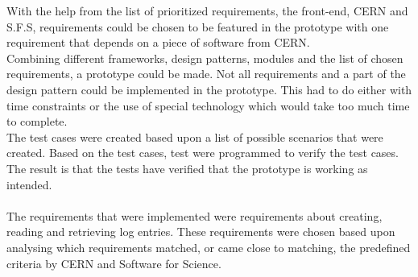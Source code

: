 \documentclass[paper=a4, fontsize=11pt,twoside]{scrartcl}	%
\begin{document}
With the help from the list of prioritized requirements, the front-end, CERN and S.F.S, requirements could be chosen to be featured in the prototype with one requirement that depends on a piece of software from CERN. \\
Combining different frameworks, design patterns, modules and the list of chosen requirements, a prototype could be made. Not all requirements and a part of the design pattern could be implemented in the prototype. This had to do either with time constraints or the use of special technology which would take too much time to complete. \\
The test cases were created based upon a list of possible scenarios that were created. Based on the test cases, test were programmed to verify the test cases. The result is that the tests have verified that the prototype is working as intended.  \\ \\
The requirements that were implemented were requirements about creating, reading and retrieving log entries. These requirements were chosen based upon analysing which requirements matched, or came close to matching, the predefined criteria by CERN and Software for Science. \\





\newpage
\end{document}
